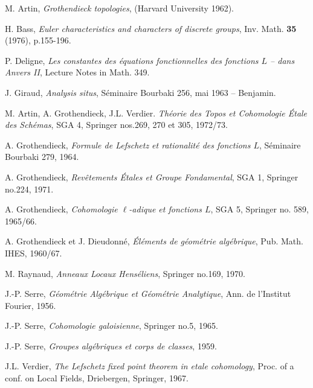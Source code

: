 \documentclass{book}
\begin{document}
\begin{thebibliography}{ab}
   M. Artin, \emph{Grothendieck topologies}, (Harvard University 1962).
  
   H. Bass, \emph{Euler characteristics and characters of discrete groups}, Inv. Math. \textbf{35} (1976), p.155-196. 
  
   P. Deligne, \emph{Les constantes des équations fonctionnelles des fonctions $L$ -- dans Anvers II}, Lecture Notes in Math. 349. 

   J. Giraud, \emph{Analysis situs}, Séminaire Bourbaki 256, mai 1963 -- Benjamin. 

   M. Artin, A. Grothendieck, J.L. Verdier. \emph{Théorie des Topos et Cohomologie Étale des Schémas}, SGA 4, Springer nos.269, 270 et 305, 1972/73.

   A. Grothendieck, \emph{Formule de Lefschetz et rationalité des fonctions $L$}, Séminaire Bourbaki 279, 1964. 

   A. Grothendieck, \emph{Revêtements Étales et Groupe Fondamental}, SGA 1, Springer no.224, 1971.
  
   A. Grothendieck, \emph{Cohomologie $\ell$-adique et fonctions $L$}, SGA 5, Springer no. 589, 1965/66. 
  
   A. Grothendieck et J. Dieudonné, \emph{Éléments de géométrie algébrique}, Pub. Math. IHES, 1960/67. 

   M. Raynaud, \emph{Anneaux Locaux Henséliens}, Springer no.169, 1970. 
  
   J.-P. Serre, \emph{Géométrie Algébrique et Géométrie Analytique}, Ann. de l'Institut Fourier, 1956. 

   J.-P. Serre, \emph{Cohomologie galoisienne}, Springer no.5, 1965.

   J.-P. Serre, \emph{Groupes algébriques et corps de classes}, 1959. 

   J.L. Verdier, \emph{The Lefschetz fixed point theorem in etale cohomology}, Proc. of a conf. on Local Fields, Driebergen, Springer, 1967. 

\end{thebibliography}
\end{document}
